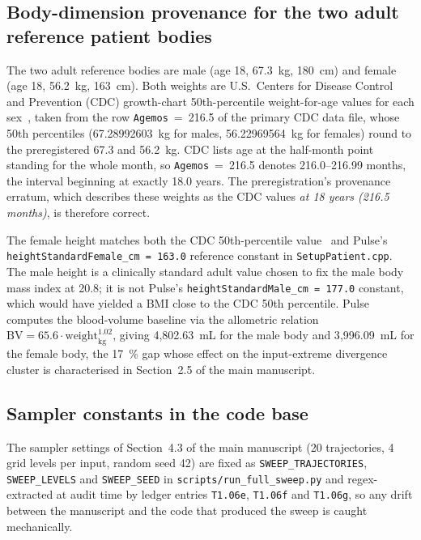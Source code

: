 \documentclass[pdflatex,sn-nature]{sn-jnl}%
\newcommand{\mainref}[2]{#2}
\begin{document}
\subsection{Body-dimension provenance for the two adult reference patient bodies}\label{sec:s3-bodies}

The two adult reference bodies are male (age 18, 67.3~kg, 180~cm) and female (age 18, 56.2~kg, 163~cm). Both weights are U.S.\ Centers for Disease Control and Prevention (CDC) growth-chart 50th-percentile weight-for-age values for each sex~\cite{kuczmarski2002cdc}, taken from the row \texttt{Agemos}~=~216.5 of the primary CDC data file, whose 50th percentiles (67.28992603~kg for males, 56.22969564~kg for females) round to the preregistered 67.3 and 56.2~kg. CDC lists age at the half-month point standing for the whole month, so \texttt{Agemos}~=~216.5 denotes 216.0--216.99 months, the interval beginning at exactly 18.0 years. The preregistration's provenance erratum, which describes these weights as the CDC values \emph{at 18 years (216.5 months)}, is therefore correct.

The female height matches both the CDC 50th-percentile value~\cite{kuczmarski2002cdc} and Pulse's \texttt{heightStandardFemale\_cm = 163.0} reference constant in \texttt{SetupPatient.cpp}. The male height is a clinically standard adult value chosen to fix the male body mass index at 20.8; it is not Pulse's \texttt{heightStandardMale\_cm = 177.0} constant, which would have yielded a BMI close to the CDC 50th percentile. Pulse computes the blood-volume baseline via the allometric relation $\text{BV} = 65.6 \cdot \text{weight}_{\text{kg}}^{1.02}$, giving 4{,}802.63~mL for the male body and 3{,}996.09~mL for the female body, the 17~\% gap whose effect on the input-extreme divergence cluster is characterised in Section~\mainref{sec:results-sex}{2.5} of the main manuscript.

\subsection{Sampler constants in the code base}\label{sec:s3-morris}

The sampler settings of Section~\mainref{sec:methods-sweep}{4.3} of the main manuscript (20 trajectories, 4 grid levels per input, random seed 42) are fixed as \texttt{SWEEP\_TRAJECTORIES}, \texttt{SWEEP\_LEVELS} and \texttt{SWEEP\_SEED} in \texttt{scripts/run\_full\_sweep.py} and regex-extracted at audit time by ledger entries \texttt{T1.06e}, \texttt{T1.06f} and \texttt{T1.06g}, so any drift between the manuscript and the code that produced the sweep is caught mechanically.
\end{document}

